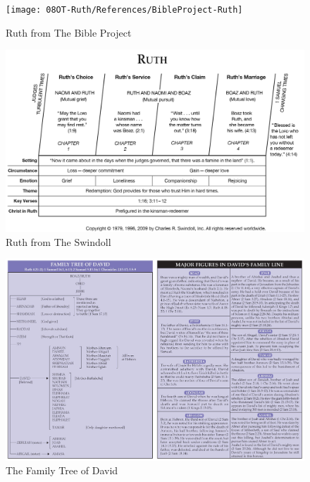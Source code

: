

\newpage
\begin{figure}
\begin{center}
\texttt{[image: 08OT-Ruth/References/BibleProject-Ruth]}
\caption[Ruth from The Bible Project]{Ruth from The Bible Project}
\label{fig:Ruth from The Bible Project}
\end{center}
\end{figure}


\newpage
\begin{figure}
\begin{center}
\includegraphics[scale=0.25, angle=90]{08OT-Ruth/References/Swindoll-Ruth}
\caption[Ruth from Swindoll]{Ruth from The Swindoll}
\label{fig:Ruth from Swindoll}
\end{center}
\end{figure}

\newpage
\begin{figure}
\begin{center}
\includegraphics[scale=0.4, angle=90]{08OT-Ruth/References/JohnGrantFamilyTreeOfDavid}
\caption[The Family Tree of David]{The Family Tree of David}
\label{fig:The Family Tree of David}
\end{center}
\end{figure}
